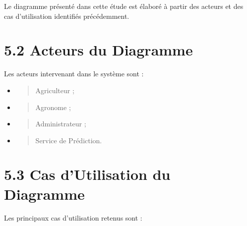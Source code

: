 \documentclass[
]{book}
\begin{document}
Le diagramme présenté dans cette étude est élaboré à partir des acteurs
et des cas d'utilisation identifiés précédemment.

\hypertarget{acteurs-du-diagramme}{%
\section{5.2 Acteurs du Diagramme}\label{acteurs-du-diagramme}}

Les acteurs intervenant dans le système sont :

\begin{itemize}
\item
  \begin{quote}
  Agriculteur ;
  \end{quote}
\item
  \begin{quote}
  Agronome ;
  \end{quote}
\item
  \begin{quote}
  Administrateur ;
  \end{quote}
\item
  \begin{quote}
  Service de Prédiction.
  \end{quote}
\end{itemize}

\hypertarget{cas-dutilisation-du-diagramme}{%
\section{5.3 Cas d'Utilisation du
Diagramme}\label{cas-dutilisation-du-diagramme}}

Les principaux cas d'utilisation retenus sont :
\end{document}
